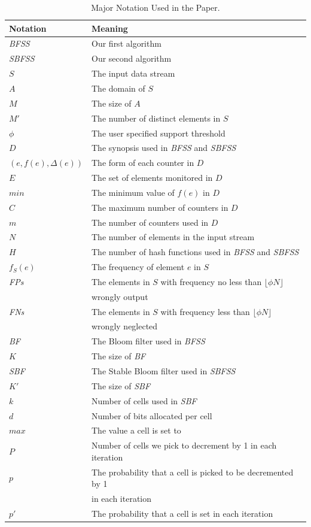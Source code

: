 \documentclass[conference]{IEEEtran}
\begin{document}
\begin{table}
	
    \caption{Major Notation Used in the Paper.}
   
	\begin{tabular}{ll}
		\hline	Notation  & Meaning\\ 
		\hline
		\emph{BFSS} & Our first algorithm\\
		\emph{SBFSS} & Our second algorithm\\	
		$S$ & The input data stream\\
		$A$ & The domain of $S$\\
		$M$ & The size of $A$\\
		$M'$ & The number of distinct elements in $S$\\
		$\phi$ & The user specified support threshold\\
		$D$ & The synopsis used in \emph{BFSS} and \emph{SBFSS}\\
	    $(e,f(e),\Delta(e))$ & The form of each counter in $D$\\ 
		$E$ & The set of elements monitored in $D$\\
		$min$ & The minimum value of $f(e)$ in $D$\\
		$C$ & The maximum number of counters in $D$\\
		$m$ & The number of counters used in $D$\\
		$N$ & The number of elements in the input stream\\
		$H$ & The number of hash functions used in \emph{BFSS} and \emph{SBFSS}\\
		$f_S(e)$ & The frequency of element $e$ in $S$\\ 
		\emph{FPs} &The elements in $S$ with frequency no less than $\lfloor \phi N\rfloor$\\& wrongly output\\
		\emph{FNs} & The elements in $S$ with frequency less than $\lfloor \phi N\rfloor$ \\&wrongly neglected\\
		\emph{BF}  &The Bloom filter used in \emph{BFSS}\\
		$K$ & The size of \emph{BF}\\
       \emph{SBF} &The Stable Bloom filter used in \emph{SBFSS}\\
        $K'$ & The size of \emph{SBF}\\
        $k$  &  Number of cells used in \emph{SBF}\\
        $d$  & Number of bits allocated per cell\\
        $max$ & The value a cell is set to\\
        $P$ &  Number of cells we pick to decrement by 1 in each iteration\\
        $p$ &  The probability that a cell is picked to be decremented by 1 \\
        &in each iteration\\
        $p'$ &  The probability that a cell is set in each iteration\\
       \hline
	\end{tabular}
\label{tab:list}

\end{table}
\end{document}
